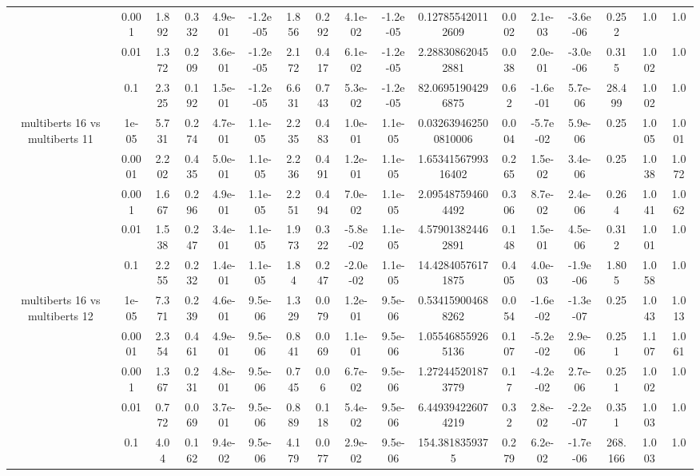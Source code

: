 \begin{tabular}{|c|c|c|c|c|c|c|c|c|c|c|c|c|c|c|c|c|}
 & 0.001 & 1.892 & 0.332 & 4.9e-01 & -1.2e-05 & 1.856 & 0.292 & 4.1e-02 & -1.2e-05 & 0.127855420112609 & 0.002 & 2.1e-03 & -3.6e-06 & 0.252 & 1.0 & 1.0 \\
 & 0.01 & 1.372 & 0.209 & 3.6e-01 & -1.2e-05 & 2.172 & 0.417 & 6.1e-02 & -1.2e-05 & 2.288308620452881 & 0.038 & 2.0e-01 & -3.0e-06 & 0.315 & 1.002 & 1.0 \\
 & 0.1 & 2.325 & 0.192 & 1.5e-01 & -1.2e-05 & 6.631 & 0.743 & 5.3e-02 & -1.2e-05 & 82.06951904296875 & 0.62 & -1.6e-01 & 5.7e-06 & 28.499 & 1.002 & 1.0 \\
\hline
\multirow{5}{*}{multiberts 16 vs multiberts 11} & 1e-05 & 5.731 & 0.274 & 4.7e-01 & 1.1e-05 & 2.235 & 0.483 & 1.0e-01 & 1.1e-05 & 0.032639462500810006 & 0.004 & -5.7e-02 & 5.9e-06 & 0.25 & 1.005 & 1.001 \\
 & 0.0001 & 2.202 & 0.435 & 5.0e-01 & 1.1e-05 & 2.236 & 0.491 & 1.2e-01 & 1.1e-05 & 1.6534156799316402 & 0.265 & 1.5e-02 & 3.4e-06 & 0.25 & 1.038 & 1.072 \\
 & 0.001 & 1.667 & 0.296 & 4.9e-01 & 1.1e-05 & 2.251 & 0.494 & 7.0e-02 & 1.1e-05 & 2.095487594604492 & 0.306 & 8.7e-02 & 2.4e-06 & 0.264 & 1.041 & 1.062 \\
 & 0.01 & 1.538 & 0.247 & 3.4e-01 & 1.1e-05 & 1.973 & 0.322 & -5.8e-02 & 1.1e-05 & 4.579013824462891 & 0.148 & 1.5e-01 & 4.5e-06 & 0.312 & 1.001 & 1.0 \\
 & 0.1 & 2.255 & 0.232 & 1.4e-01 & 1.1e-05 & 1.84 & 0.247 & -2.0e-02 & 1.1e-05 & 14.42840576171875 & 0.405 & 4.0e-03 & -1.9e-06 & 1.805 & 1.058 & 1.0 \\
\hline
\multirow{5}{*}{multiberts 16 vs multiberts 12} & 1e-05 & 7.371 & 0.239 & 4.6e-01 & 9.5e-06 & 1.329 & 0.079 & 1.2e-01 & 9.5e-06 & 0.534159004688262 & 0.054 & -1.6e-02 & -1.3e-07 & 0.25 & 1.043 & 1.013 \\
 & 0.0001 & 2.354 & 0.461 & 4.9e-01 & 9.5e-06 & 0.841 & 0.069 & 1.1e-01 & 9.5e-06 & 1.055468559265136 & 0.107 & -5.2e-02 & 2.9e-06 & 0.251 & 1.107 & 1.061 \\
 & 0.001 & 1.367 & 0.231 & 4.8e-01 & 9.5e-06 & 0.745 & 0.06 & 6.7e-02 & 9.5e-06 & 1.272445201873779 & 0.17 & -4.2e-02 & 2.7e-06 & 0.251 & 1.002 & 1.0 \\
 & 0.01 & 0.772 & 0.069 & 3.7e-01 & 9.5e-06 & 0.889 & 0.118 & 5.4e-02 & 9.5e-06 & 6.449394226074219 & 0.32 & 2.8e-02 & -2.2e-07 & 0.351 & 1.003 & 1.0 \\
 & 0.1 & 4.04 & 0.162 & 9.4e-02 & 9.5e-06 & 4.179 & 0.077 & 2.9e-02 & 9.5e-06 & 154.3818359375 & 0.279 & 6.2e-02 & -1.7e-06 & 268.166 & 1.003 & 1.0 \\

\end{tabular}
